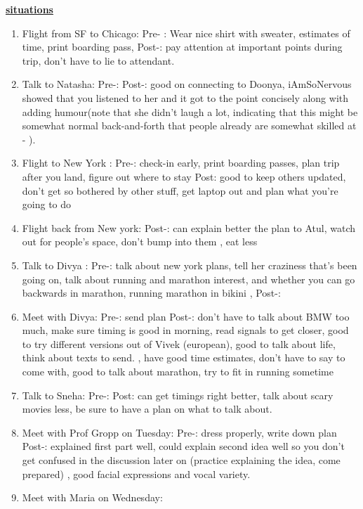 \underline{\textbf{situations}} \\
\begin{enumerate}
\item Flight from SF to Chicago: Pre- : Wear nice shirt with sweater, estimates of time, print boarding pass,  Post-: pay attention at important points during trip, don't have to lie to attendant.

\item Talk to Natasha:  Pre-:    Post-:  good on connecting to Doonya,
iAmSoNervous showed that you listened to her and it got to the point
concisely along with adding humour(note that she didn't laugh a lot,
indicating that this might be somewhat normal back-and-forth that
people already are somewhat skilled at - ).


\item  Flight to New York : Pre-: check-in early, print boarding passes, plan trip after you land, figure out where to stay Post: good to keep others updated, don't get so bothered by other stuff, get laptop out and plan what you're going to do 

\item Flight back from New york: Post-: can explain better the plan to Atul, watch out for people's space, don't bump into them , eat less 

\item Talk to Divya : Pre-:  talk about new york plans, tell her craziness that's been going on, talk about running and marathon interest, and whether you can go backwards in marathon, running marathon in bikini ,  Post-: 

\item Meet with Divya: Pre-: send plan   Post-: don't have to talk about BMW too much, make sure timing is good in morning, read signals to get closer, good to try different versions out of Vivek (european), good to talk about life, think about texts to send. , have good time estimates, don't have to say to come with, good to talk about marathon, try to fit in running sometime

\item Talk to Sneha: Pre-:   Post:  can get timings right better, talk about scary movies less, be sure to have a plan on what to talk about.

\item Meet with Prof Gropp on Tuesday:  Pre-: dress properly, write down plan  Post-:  explained first part well, could explain second idea well so you don't get confused in the discussion later on (practice explaining the idea, come prepared) , good facial expressions and vocal variety.

\item Meet with Maria on Wednesday:

\end{enumerate}

